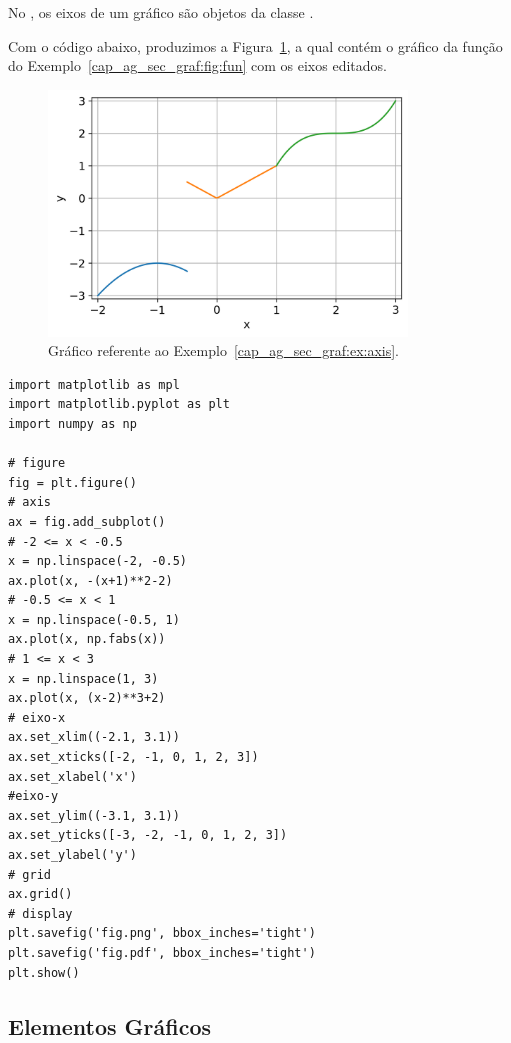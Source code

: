 No {\PYTHONmatplotlib}, os eixos de um gráfico são objetos da classe {\PYTHONmatplotlibDOTaxisDOTAxis}.

\begin{ex}\label{cap_ag_sec_graf:ex:axis}
  Com o código abaixo, produzimos a Figura~\ref{cap_ag_sec_graf:fig:eixos}, a qual contém o gráfico da função do Exemplo~\ref{cap_ag_sec_graf:fig:fun} com os eixos editados.

  \begin{figure}[H]
    \centering
    \includegraphics[width=3.75in]{./cap_ag/dados/fig_eixos/fig.png}
    \caption{Gráfico referente ao Exemplo~\ref{cap_ag_sec_graf:ex:axis}.}
    \label{cap_ag_sec_graf:fig:eixos}
  \end{figure}  

\begin{lstlisting}
import matplotlib as mpl
import matplotlib.pyplot as plt
import numpy as np

# figure
fig = plt.figure()
# axis
ax = fig.add_subplot()
# -2 <= x < -0.5
x = np.linspace(-2, -0.5)
ax.plot(x, -(x+1)**2-2)
# -0.5 <= x < 1
x = np.linspace(-0.5, 1)
ax.plot(x, np.fabs(x))
# 1 <= x < 3
x = np.linspace(1, 3)
ax.plot(x, (x-2)**3+2)
# eixo-x
ax.set_xlim((-2.1, 3.1))
ax.set_xticks([-2, -1, 0, 1, 2, 3])
ax.set_xlabel('x')
#eixo-y
ax.set_ylim((-3.1, 3.1))
ax.set_yticks([-3, -2, -1, 0, 1, 2, 3])
ax.set_ylabel('y')
# grid
ax.grid()
# display
plt.savefig('fig.png', bbox_inches='tight')
plt.savefig('fig.pdf', bbox_inches='tight')
plt.show()
\end{lstlisting}

\end{ex}

\subsection{Elementos Gráficos}

